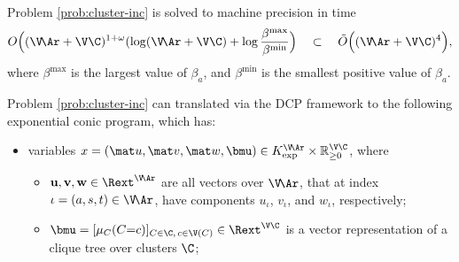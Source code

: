 \begin{lemma}\label{lem:cluster-inc-polytime}
Problem \eqref{prob:cluster-inc} is solved to machine precision in time
\[
    O\Big( (\V\!\Ar + \V\C)^{1 + \omega} ( \log (\V\!\Ar + \V\C) 
        + \log \frac{\beta^{\max}}{\beta^{\min}} \Big)
    \quad \subset \quad
        \tilde O\Big( (\V\!\Ar + \V\C)^4 \Big),
\]
where $\beta^{\max}$ is the largest value of $\beta_a$, and $\beta^{\min}$ is the smallest positive value of $\beta_a$.
\end{lemma}
\begin{lproof}
    Problem \eqref{prob:cluster-inc}
    can translated via the DCP framework to 
    the following exponential conic program, which has:
    \begin{itemize}[label=$\blacktriangleright$]
    \item variables 
        $x = (\mat u, \mat v, \mat w, \bmu) \in K_{\exp}^{\V\!\Ar} \times \mathbb R_{\ge 0}^{\V \C}$, 
        where 
        \begin{itemize}[label=\textbullet]
        \item $\mathbf{u, v,w} \in \Rext^{\V\!\Ar}$
            are all vectors over $\V\!\Ar$,
            that at index $\iota = (a,s,t) \in \V\!\Ar$, have 
            components $u_\iota$, $v_\iota$, and $w_\iota$, respectively;
        \item
            $\bmu = [\mu_{C}(C{=}c)]_%
            {C \in \C,\,c \in\V(C)}
             \in \Rext^{\V \C}$ is a vector representation of a clique tree over clusters $\C$;
    \end{itemize}


\end{itemize}
\end{lproof}
